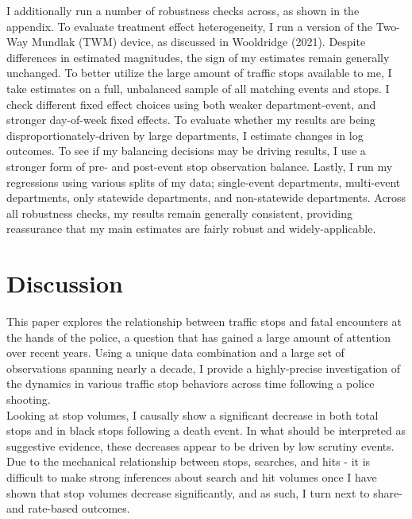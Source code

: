 I additionally run a number of robustness checks across, as shown in the appendix. To evaluate treatment effect heterogeneity, I run a version of the Two-Way Mundlak (TWM) device, as discussed in Wooldridge (2021). Despite differences in estimated magnitudes, the sign of my estimates remain generally unchanged. To better utilize the large amount of traffic stops available to me, I take estimates on a full, unbalanced sample of all matching events and stops. I check different fixed effect choices using both weaker department-event, and stronger day-of-week fixed effects. To evaluate whether my results are being disproportionately-driven by large departments, I estimate changes in log outcomes. To see if my balancing decisions may be driving results, I use a stronger form of pre- and post-event stop observation balance. Lastly, I run my regressions using various splits of my data; single-event departments, multi-event departments, only statewide departments, and non-statewide departments. Across all robustness checks, my results remain generally consistent, providing reassurance that my main estimates are fairly robust and widely-applicable. \\

\section{Discussion}
This paper explores the relationship between traffic stops and fatal encounters at the hands of the police, a question that has gained a large amount of attention over recent years. Using a unique data combination and a large set of observations spanning nearly a decade, I provide a highly-precise investigation of the dynamics in various traffic stop behaviors across time following a police shooting. \\

Looking at stop volumes, I causally show a significant decrease in both total stops and in black stops following a death event. In what should be interpreted as suggestive evidence, these decreases appear to be driven by low scrutiny events. Due to the mechanical relationship between stops, searches, and hits - it is difficult to make strong inferences about search and hit volumes once I have shown that stop volumes decrease significantly, and as such, I turn next to share- and rate-based outcomes. \\

